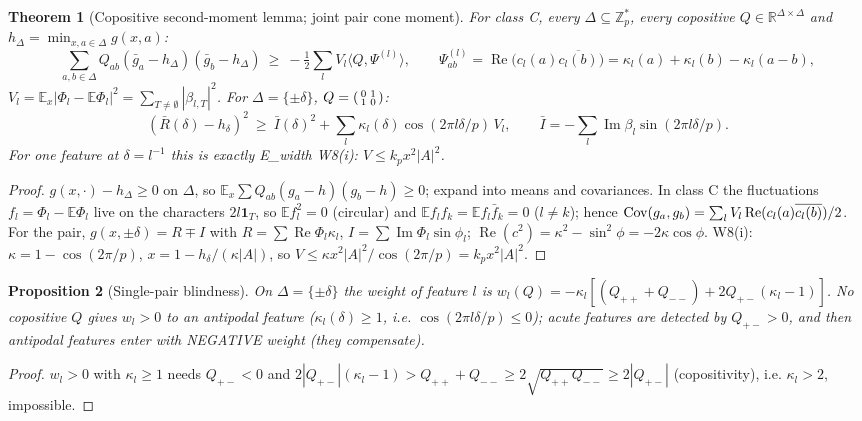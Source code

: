 \documentclass[11pt]{article}
\newtheorem{theorem}{Theorem}
\newtheorem{proposition}[theorem]{Proposition}
\theoremstyle{definition}
\newcommand{\Re}{\operatorname{Re}}
\newcommand{\Im}{\operatorname{Im}}
\begin{document}
\begin{theorem}[Copositive second-moment lemma; joint pair cone moment]\label{thm:jcm}
For class C, every $\Delta\subseteq\mathbb Z_p^*$, every copositive $Q\in\mathbb R^{\Delta\times\Delta}$ and $h_\Delta=\min_{x,a\in\Delta}g(x,a)$:
\[\sum_{a,b\in\Delta}Q_{ab}(\bar g_a-h_\Delta)(\bar g_b-h_\Delta)\ \ge\ -\tfrac12\sum_lV_l\langle Q,\Psi^{(l)}\rangle,\qquad
\Psi^{(l)}_{ab}=\Re\big(c_l(a)\overline{c_l(b)}\big)=\kappa_l(a)+\kappa_l(b)-\kappa_l(a-b),\]
$V_l=\mathbb E_x|\Phi_l-\mathbb E\Phi_l|^2=\sum_{T\ne\emptyset}|\beta_{l,T}|^2$. For $\Delta=\{\pm\delta\}$, $Q=\begin{psmallmatrix}0&1\\1&0\end{psmallmatrix}$:
\[(\bar R(\delta)-h_\delta)^2\ \ge\ \bar I(\delta)^2+\sum_l\kappa_l(\delta)\cos(2\pi l\delta/p)\,V_l ,\qquad \bar I=-\textstyle\sum_l\Im\beta_l\sin(2\pi l\delta/p).\]
For one feature at $\delta=l^{-1}$ this is exactly E\_width W8(i): $V\le k_px^2|A|^2$.
\end{theorem}
\begin{proof} $g(x,\cdot)-h_\Delta\ge0$ on $\Delta$, so $\mathbb E_x\sum Q_{ab}(g_a-h)(g_b-h)\ge0$; expand into means and covariances.
In class C the fluctuations $f_l=\Phi_l-\mathbb E\Phi_l$ live on the characters $2l\mathbf 1_T$, so $\mathbb Ef_l^2=0$ (circular) and
$\mathbb Ef_lf_k=\mathbb Ef_l\bar f_k=0$ ($l\ne k$); hence ${\rm Cov}(g_a,g_b)=\sum_lV_l\Re(c_l(a)\overline{c_l(b)})/2$.
For the pair, $g(x,\pm\delta)=R\mp I$ with $R=\sum\Re\Phi_l\kappa_l$, $I=\sum\Im\Phi_l\sin\phi_l$; $\Re(c^2)=\kappa^2-\sin^2\phi=-2\kappa\cos\phi$.
W8(i): $\kappa=1-\cos(2\pi/p)$, $x=1-h_\delta/(\kappa|A|)$, so $V\le\kappa x^2|A|^2/\cos(2\pi/p)=k_px^2|A|^2$.\end{proof}

\begin{proposition}[Single-pair blindness]\label{prop:blind}
On $\Delta=\{\pm\delta\}$ the weight of feature $l$ is $w_l(Q)=-\kappa_l[(Q_{++}+Q_{--})+2Q_{+-}(\kappa_l-1)]$. No copositive $Q$ gives
$w_l>0$ to an antipodal feature ($\kappa_l(\delta)\ge1$, i.e. $\cos(2\pi l\delta/p)\le0$); acute features are detected by $Q_{+-}>0$,
and then antipodal features enter with NEGATIVE weight (they compensate).
\end{proposition}
\begin{proof} $w_l>0$ with $\kappa_l\ge1$ needs $Q_{+-}<0$ and $2|Q_{+-}|(\kappa_l-1)>Q_{++}+Q_{--}\ge2\sqrt{Q_{++}Q_{--}}\ge2|Q_{+-}|$
(copositivity), i.e. $\kappa_l>2$, impossible.\end{proof}
\end{document}
